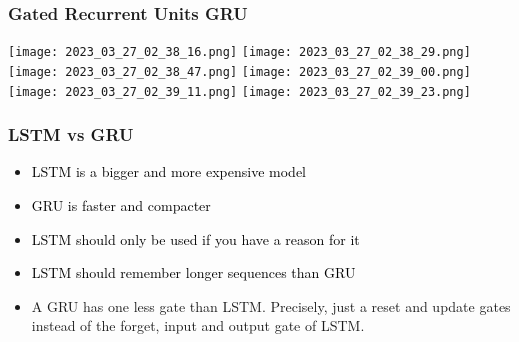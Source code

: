 \documentclass[main.tex,fontsize=8pt,paper=a4,paper=portrait,DIV=calc,]{scrartcl}
\begin{document}
\subsubsection{Gated Recurrent Units GRU}
\texttt{[image: 2023\_03\_27\_02\_38\_16.png]}\newline
\texttt{[image: 2023\_03\_27\_02\_38\_29.png]}\newline
\texttt{[image: 2023\_03\_27\_02\_38\_47.png]}\newline
\texttt{[image: 2023\_03\_27\_02\_39\_00.png]}\newline
\texttt{[image: 2023\_03\_27\_02\_39\_11.png]}\newline
\texttt{[image: 2023\_03\_27\_02\_39\_23.png]}\newline

\subsubsection{LSTM vs GRU}
\begin{itemize}
\item \textcolor{black}{LSTM is a bigger and more expensive model}
\item \textcolor{black}{GRU is faster and compacter}
\item \textcolor{black}{LSTM should only be used if you have a reason for it}
\item \textcolor{black}{LSTM should remember longer sequences than GRU}
\item A GRU has one less gate than LSTM. Precisely, just a reset and update gates instead of the forget, input and output gate of LSTM.
\end{itemize} 
\end{document}
